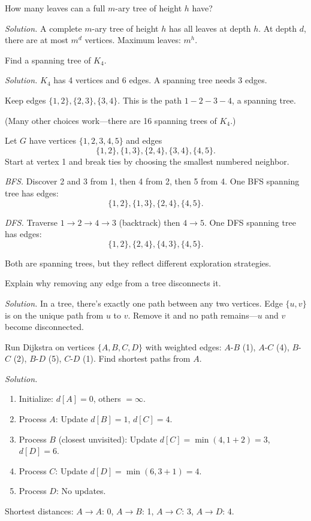 \begin{example}
How many leaves can a full $m$-ary tree of height $h$ have?

\emph{Solution.} A complete $m$-ary tree of height $h$ has all leaves at depth $h$. At depth $d$, there are at most $m^d$ vertices. Maximum leaves: $m^h$.
\end{example}

\begin{example}
Find a spanning tree of $K_4$.

\emph{Solution.} $K_4$ has 4 vertices and 6 edges. A spanning tree needs 3 edges.

Keep edges $\{1,2\}, \{2,3\}, \{3,4\}$. This is the path $1-2-3-4$, a spanning tree.

(Many other choices work---there are 16 spanning trees of $K_4$.)
\end{example}

\begin{example}
Let $G$ have vertices $\{1,2,3,4,5\}$ and edges
\[
\{1,2\}, \{1,3\}, \{2,4\}, \{3,4\}, \{4,5\}.
\]
Start at vertex 1 and break ties by choosing the smallest numbered neighbor.

\emph{BFS.} Discover 2 and 3 from 1, then 4 from 2, then 5 from 4. One BFS spanning tree has edges:
\[
\{1,2\}, \{1,3\}, \{2,4\}, \{4,5\}.
\]

\emph{DFS.} Traverse $1 \to 2 \to 4 \to 3$ (backtrack) then $4 \to 5$. One DFS spanning tree has edges:
\[
\{1,2\}, \{2,4\}, \{4,3\}, \{4,5\}.
\]

Both are spanning trees, but they reflect different exploration strategies.
\end{example}

\begin{example}
Explain why removing any edge from a tree disconnects it.

\emph{Solution.} In a tree, there's exactly one path between any two vertices. Edge $\{u, v\}$ is on the unique path from $u$ to $v$. Remove it and no path remains---$u$ and $v$ become disconnected.
\end{example}

\begin{example}
Run Dijkstra on vertices $\{A, B, C, D\}$ with weighted edges: $A$-$B$ (1), $A$-$C$ (4), $B$-$C$ (2), $B$-$D$ (5), $C$-$D$ (1). Find shortest paths from $A$.

\emph{Solution.}
\begin{enumerate}
  \item Initialize: $d[A] = 0$, others $= \infty$.
  \item Process $A$: Update $d[B] = 1$, $d[C] = 4$.
  \item Process $B$ (closest unvisited): Update $d[C] = \min(4, 1+2) = 3$, $d[D] = 6$.
  \item Process $C$: Update $d[D] = \min(6, 3+1) = 4$.
  \item Process $D$: No updates.
\end{enumerate}
Shortest distances: $A \to A$: 0, $A \to B$: 1, $A \to C$: 3, $A \to D$: 4.
\end{example}

